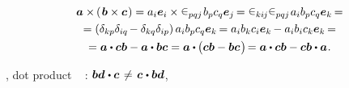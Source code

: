 \begin{otherlanguage}{russian}
\nopagebreak\vspace{-0.5em}\begin{multline}
\bm{a} \times \hspace{-0.15ex} \left(\hspace{.2ex}{\bm{b} \times \bm{c}}\hspace{.15ex}\right)
= a_i \bm{e}_i \times \levicivita_{pqj} \hspace{.2ex} b_p c_q \bm{e}_j \hspace{-0.2ex}
= \levicivita_{ki\hspace{-0.1ex}j} \levicivita_{pqj} \hspace{.2ex} a_i b_p c_q \bm{e}_k \hspace{-0.2ex} =
\\
= \left({\delta_{kp}\delta_{iq} \hspace{-0.2ex} - \delta_{kq}\delta_{ip}}\right) a_i b_p c_q \bm{e}_k \hspace{-0.2ex}
= a_i b_k c_i \bm{e}_k \hspace{-0.15ex} - a_i b_i c_k \bm{e}_k \hspace{-0.2ex} =
\\
= \bm{a} \dotp \bm{c} \bm{b} - \bm{a} \dotp \bm{b} \bm{c}
= \bm{a} \dotp \hspace{-0.1ex} \bigl( \bm{c} \bm{b} - \bm{b} \bm{c} \hspace{.15ex} \bigr) \hspace{-0.3ex}
= \bm{a} \dotp \bm{c} \bm{b} - \bm{c} \bm{b} \dotp \bm{a}
\hspace{.1ex} .
\end{multline}

\end{otherlanguage}

\vspace{-0.1em}\noindent
{}, dot product  ~ :\ru{\hspace{.2ex}}
${\bm{b} \bm{d} \hspace{.1ex} \dotp \bm{c} \hspace{.25ex} \neq \hspace{.25ex} \bm{c} \hspace{.1ex} \dotp \bm{b} \bm{d}}$,
~ 

